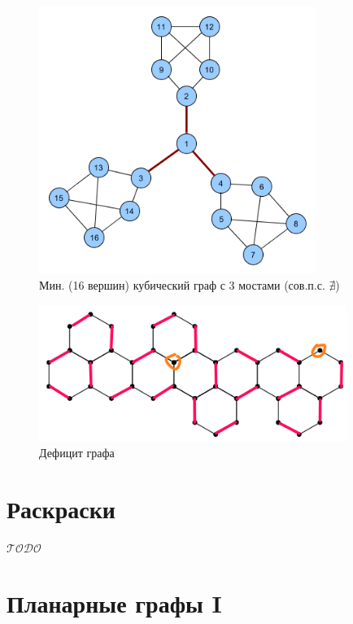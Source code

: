 \documentclass[a4paper,12pt]{article}
\theoremstyle{remark}
\def\iiTODO{\guillemotleft$\mathcal{TODO}$\guillemotright\textellipsis}
\begin{document}
\begin{figure}[H]
	\centering
	\includegraphics[width=9cm]{minimum-cubic-graph-with3-bridges.png}
	\caption{Мин. (16 вершин) кубический граф с 3 мостами (сов.п.с. $\nexists$)}
\end{figure}

\begin{figure}[H]
	\centering
	\includegraphics[width=10cm]{matching-deficit-2.png}
	\caption{Дефицит графа}
\end{figure}




\section{Раскраски}

\iiTODO




\section{Планарные графы I}
\end{document}
